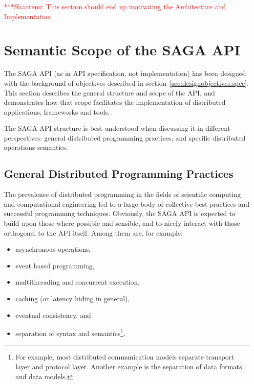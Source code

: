 \documentclass[a4paper,12pt]{article}
\newcommand{\jhanote}[1]{  {\textcolor{red}  { ***Shantenu: #1 }}}
\newcommand{\jhanote}[1]{}
\begin{document}
\jhanote{This section should end up motivating the Architecture and
 Implementation}


% 
\section{Semantic Scope of the SAGA API}
\label{sec:api}

 The SAGA API (as in API specification, not implementation) has been
 designed with the background of objectives described in
 section~\ref{sec:designobjectives.spec}.  This section describes the
 general structure and scope of the API, and demonstrates how that
 scope facilitates the implementation of distributed applications,
 frameworks and tools.

 The SAGA API structure is best understood when discussing it in
 different perspectives: general distributed programming practices,
 and specific distributed operations semantics.

 \subsection{General Distributed Programming Practices}
 
  The prevalence of distributed programming in the fields of
  scientific computing and computational engineering led to a large
  body of collective best practices and successful programming
  techniques.  Obviously, the SAGA API is expected to build upon those
  where possible and sensible, and to nicely interact with those
  orthogonal to the API itself.  Among them are, for example:

  \begin{itemize}

   \item asynchronous operations,
   \item event based programming,
   \item multithreading and concurrent execution, 
   \item caching (or latency hiding in general), 
   \item eventual consistency, and 
   \item separation of syntax and semantics\footnote{For example, most
         distributed communication models separate transport layer and 
         protocol layer.  Another example is the separation of data 
         formats and data models.}.
  \end{itemize}
\end{document}

